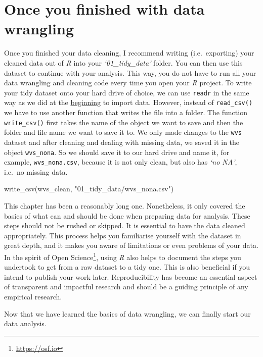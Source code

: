 \documentclass[
  letterpaper,
]{krantz}
\makeatletter
\newenvironment{Shaded}{\begin{snugshade}}{\end{snugshade}}
\newcommand{\FunctionTok}[1]{\textcolor[rgb]{0.28,0.35,0.67}{#1}}
\newcommand{\NormalTok}[1]{\textcolor[rgb]{0.00,0.23,0.31}{#1}}
\newcommand{\StringTok}[1]{\textcolor[rgb]{0.13,0.47,0.30}{#1}}
\renewcommand{\href}[2]{#2\footnote{\url{#1}}}
\newenvironment{kframe}{%
\medskip{}
\setlength{\fboxsep}{.8em}
 \def\at@end@of@kframe{}%
 \ifinner\ifhmode%
  \def\at@end@of@kframe{\end{minipage}}%
  \begin{minipage}{\columnwidth}%
 \fi\fi%
 \def\FrameCommand##1{\hskip\@totalleftmargin \hskip-\fboxsep
 \colorbox{shadecolor}{##1}\hskip-\fboxsep
     \hskip-\linewidth \hskip-\@totalleftmargin \hskip\columnwidth}%
 \MakeFramed {\advance\hsize-\width
   \@totalleftmargin\z@ \linewidth\hsize
   \@setminipage}}%
 {\par\unskip\endMakeFramed%
 \at@end@of@kframe}
\renewenvironment{Shaded}{\begin{kframe}}{\end{kframe}}
\makeatother
\begin{document}
\section{Once you finished with data
wrangling}\label{sec-conclusion-data-wrangling}

Once you finished your data cleaning, I recommend writing
(i.e.~exporting) your cleaned data out of \emph{R} into your
\emph{`01\_tidy\_data'} folder. You can then use this dataset to
continue with your analysis. This way, you do not have to run all your
data wrangling and cleaning code every time you open your \emph{R}
project. To write your tidy dataset onto your hard drive of choice, we
can use \texttt{readr} in the same way as we did at the
\hyperref[importing-data-using-functions]{beginning} to import data.
However, instead of \texttt{read\_csv()} we have to use another function
that writes the file into a folder. The function \texttt{write\_csv()}
first takes the name of the object we want to save and then the folder
and file name we want to save it to. We only made changes to the
\texttt{wvs} dataset and after cleaning and dealing with missing data,
we saved it in the object \texttt{wvs\_nona}. So we should save it to
our hard drive and name it, for example, \texttt{wvs\_nona.csv}, because
it is not only clean, but also has \emph{`no NA'}, i.e.~no missing data.

\begin{Shaded}
\begin{Highlighting}[]
\FunctionTok{write\_csv}\NormalTok{(wvs\_clean, }\StringTok{"01\_tidy\_data/wvs\_nona.csv"}\NormalTok{)}
\end{Highlighting}
\end{Shaded}

This chapter has been a reasonably long one. Nonetheless, it only
covered the basics of what can and should be done when preparing data
for analysis. These steps should not be rushed or skipped. It is
essential to have the data cleaned appropriately. This process helps you
familiarise yourself with the dataset in great depth, and it makes you
aware of limitations or even problems of your data. In the spirit of
\href{https://osf.io}{Open Science}, using \emph{R} also helps to
document the steps you undertook to get from a raw dataset to a tidy
one. This is also beneficial if you intend to publish your work later.
Reproducibility has become an essential aspect of transparent and
impactful research and should be a guiding principle of any empirical
research.

Now that we have learned the basics of data wrangling, we can finally
start our data analysis.
\end{document}

